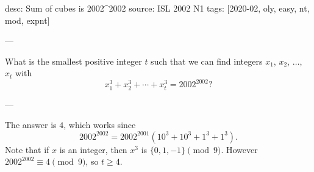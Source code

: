 desc: Sum of cubes is 2002^2002
source: ISL 2002 N1
tags: [2020-02, oly, easy, nt, mod, expnt]

---

What is the smallest positive integer $t$ such that we can find integers $x_1$, $x_2$, $\ldots$, $x_t$ with \[x_1^3+x_2^3+\cdots+x_t^3=2002^{2002}?\]

---

The answer is $4$, which works since \[2002^{2002}=2002^{2001}\left(10^3+10^3+1^3+1^3\right).\]
Note that if $x$ is an integer, then $x^3$ is $\{0,1,-1\}\pmod9$. However $2002^{2002}\equiv4\pmod9$, so $t\ge4$.
